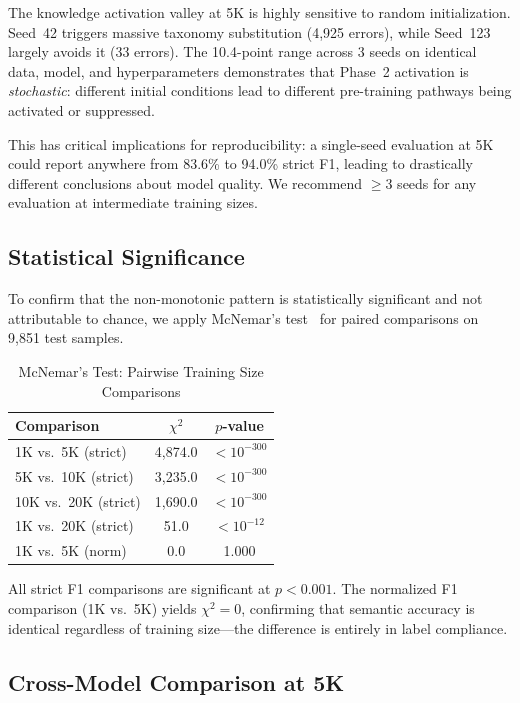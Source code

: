 \documentclass[review,3p]{elsarticle}
\begin{document}
The knowledge activation valley at 5K is highly sensitive to random initialization. Seed~42 triggers massive taxonomy substitution (4,925 errors), while Seed~123 largely avoids it (33 errors). The 10.4-point range across 3 seeds on identical data, model, and hyperparameters demonstrates that Phase~2 activation is \emph{stochastic}: different initial conditions lead to different pre-training pathways being activated or suppressed.

This has critical implications for reproducibility: a single-seed evaluation at 5K could report anywhere from 83.6\% to 94.0\% strict F1, leading to drastically different conclusions about model quality. We recommend $\geq$3 seeds for any evaluation at intermediate training sizes.

\subsection{Statistical Significance}
To confirm that the non-monotonic pattern is statistically significant and not attributable to chance, we apply McNemar's test~\cite{mcnemar1947} for paired comparisons on 9,851 test samples.

\begin{table}[!ht]
\centering
\caption{McNemar's Test: Pairwise Training Size Comparisons}
\label{tab:mcnemar}
\begin{tabular}{lcc}
\toprule
\textbf{Comparison} & \textbf{$\chi^2$} & \textbf{$p$-value} \\
\midrule
1K vs.\ 5K (strict) & 4,874.0 & $<10^{-300}$ \\
5K vs.\ 10K (strict) & 3,235.0 & $<10^{-300}$ \\
10K vs.\ 20K (strict) & 1,690.0 & $<10^{-300}$ \\
1K vs.\ 20K (strict) & 51.0 & $<10^{-12}$ \\
\midrule
1K vs.\ 5K (norm) & 0.0 & 1.000 \\
\bottomrule
\end{tabular}
\end{table}

All strict F1 comparisons are significant at $p < 0.001$. The normalized F1 comparison (1K vs.\ 5K) yields $\chi^2 = 0$, confirming that semantic accuracy is identical regardless of training size---the difference is entirely in label compliance.

\subsection{Cross-Model Comparison at 5K}
\end{document}
